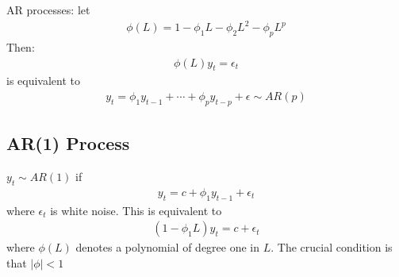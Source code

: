 \documentclass[a4paper,twoside,11pt]{article}
\begin{document}
\begin{shaded*}
\noindent AR processes: let
\begin{equation*}
\begin{aligned}
\phi(L) = 1- \phi_1L - \phi_2 L^2 -  \phi_p L^p
\end{aligned}
\end{equation*}
Then: 
\begin{equation*}
\begin{aligned}
\phi(L)y_t = \epsilon_t
\end{aligned}
\end{equation*}
is equivalent to
\begin{equation*}
\begin{aligned}
y_t = \phi_1 y_{t-1} + \cdots + \phi_p y_{t-p} + \epsilon \sim AR(p)
\end{aligned}
\end{equation*}

\subsection{AR(1) Process}
\noindent $y_t \sim AR(1)$ if
\begin{equation*}
\begin{aligned}
y_t = c + \phi_1 y_{t-1} + \epsilon_t
\end{aligned}
\end{equation*}
where $\epsilon_t$ is white noise.
\newline
This is equivalent to 
\begin{equation*}
\begin{aligned}
(1- \phi_1 L)y_t = c+ \epsilon_t
\end{aligned}
\end{equation*}
where $\phi(L)$ denotes a polynomial of degree one in $L$. 
\newline
\textcolor{NavyBlue}{The crucial condition is that $|\phi|<1$}

\end{shaded*}
\end{document}
